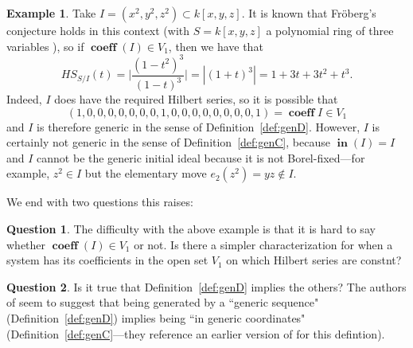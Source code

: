 \documentclass[11pt]{article}
\DeclareMathOperator{\Init}{\mathbf{in}}
\DeclareMathOperator{\coeff}{\textbf{coeff}}
\theoremstyle{definition}
\newtheorem{example}{Example}
\newtheorem{question}{Question}
\begin{document}
\begin{example}\label{maybecounterex}
	Take $I = (x^2, y^2, z^2) \subset k[x,y,z]$. It is known that Fröberg's conjecture holds in this context (with $S = k[x,y,z]$ a polynomial ring of three variables \cite{TRUNG201979}), so if $\coeff(I) \in V_1$, then we have that \[ HS_{S/I} (t) = \bigg| \frac{(1 - t^2)^3}{(1 - t)^3} \bigg| = |(1 + t)^3| = 1 + 3t + 3t^2 + t^3. \] Indeed, $I$ does have the required Hilbert series, so it is possible that \[ (1,0,0,0,0,0,0,0,1,0,0,0,0,0,0,0,0,1) = \coeff I \in V_1 \] and $I$ is therefore generic in the sense of Definition~\ref{def:genD}. However, $I$ is certainly not generic in the sense of Definition~\ref{def:genC}, because $\Init(I) = I$ and $I$ cannot be the generic initial ideal because it is not Borel-fixed---for example, $z^2 \in I$ but the elementary move $e_2(z^2) = yz \notin I$. 
\end{example}


We end with two questions this raises:


\begin{question}
	The difficulty with the above example is that it is hard to say whether $\coeff(I) \in V_1$ or not. Is there a simpler characterization for when a system has its coefficients in the open set $V_1$ on which Hilbert series are constnt?
\end{question} 

\begin{question}
	Is it true that Definition~\ref{def:genD} implies the others? The authors of \cite{bigdeli2021semi} seem to suggest that being generated by a ``generic sequence" (Definition~\ref{def:genD}) implies being ``in generic coordinates" (Definition~\ref{def:genC}---they reference an earlier version of \cite{caminata2020solving} for this defintion). 
\end{question}





\nocite{atiyah1969introduction}
\nocite{M2}
\nocite{sage}

\newpage


\end{document}

